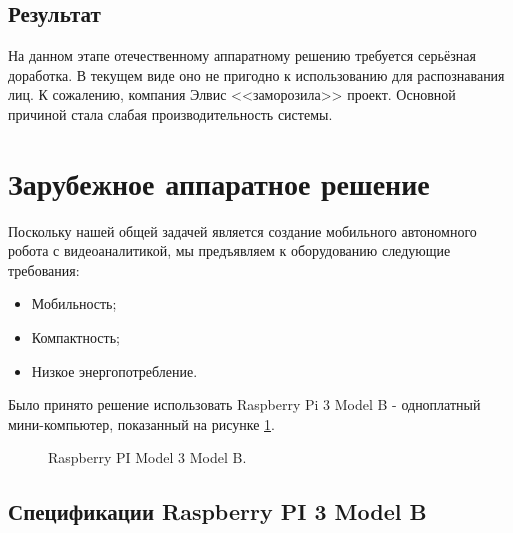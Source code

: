 \documentclass[12pt,a4paper]{scrartcl}
\begin{document}
	\subsection{Результат}
	
		На данном этапе отечественному аппаратному решению требуется серьёзная доработка. В текущем виде оно не пригодно к использованию для распознавания лиц. К сожалению, компания Элвис <<заморозила>> проект. Основной причиной стала слабая производительность системы.

\section{Зарубежное аппаратное решение}

	Поскольку нашей общей задачей является создание мобильного автономного робота с видеоаналитикой, мы предъявляем к оборудованию следующие требования:
	\begin{itemize}
		\item Мобильность;
		\item Компактность;
		\item Низкое энергопотребление.
	\end{itemize}
	
	Было принято решение использовать Raspberry Pi 3 Model B - одноплатный мини-компьютер, показанный на рисунке \ref{fig:PI1}.
	
	\begin{figure}[h]
		\caption{Raspberry PI Model 3 Model B.}
		\label{fig:PI1}
	\end{figure}

	\subsection{Спецификации Raspberry PI 3 Model B}
	
\end{document}
